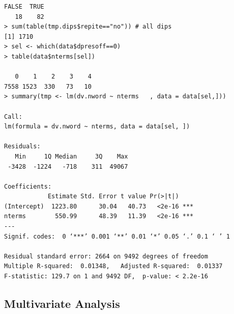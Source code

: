 \documentclass[letter,12pt]{article}
\begin{document}
  \begin{footnotesize}
    \begin{verbatim}
FALSE  TRUE 
   18    82 
> sum(table(tmp.dips$repite=="no")) # all dips
[1] 1710
> sel <- which(data$dpresoff==0)
> table(data$nterms[sel])

   0    1    2    3    4 
7558 1523  330   73   10 
> summary(tmp <- lm(dv.nword ~ nterms   , data = data[sel,]))

Call:
lm(formula = dv.nword ~ nterms, data = data[sel, ])

Residuals:
   Min     1Q Median     3Q    Max 
 -3428  -1224   -718    311  49067 

Coefficients:
            Estimate Std. Error t value Pr(>|t|)    
(Intercept)  1223.80      30.04   40.73   <2e-16 ***
nterms        550.99      48.39   11.39   <2e-16 ***
---
Signif. codes:  0 ‘***’ 0.001 ‘**’ 0.01 ‘*’ 0.05 ‘.’ 0.1 ‘ ’ 1

Residual standard error: 2664 on 9492 degrees of freedom
Multiple R-squared:  0.01348,	Adjusted R-squared:  0.01337 
F-statistic: 129.7 on 1 and 9492 DF,  p-value: < 2.2e-16
    \end{verbatim}
  \end{footnotesize}

  
  \subsection{Multivariate Analysis}



\end{document}
